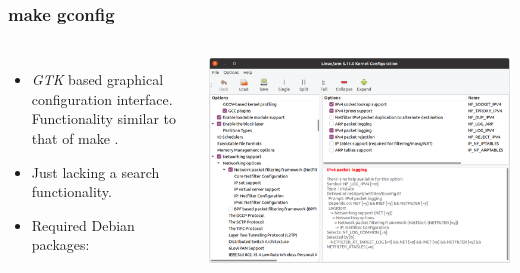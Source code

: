 \begin{frame}
  \frametitle{make gconfig}
  \begin{columns}
    \begin{itemize}
      \item {\em GTK} based graphical configuration interface. Functionality
            similar to that of make .
      \item Just lacking a search functionality.
      \item Required Debian packages: 
    \end{itemize}
    \includegraphics[width=\textwidth]{slides/sysdev-kernel-building/gconfig-screenshot.png}
  \end{columns}
\end{frame}

